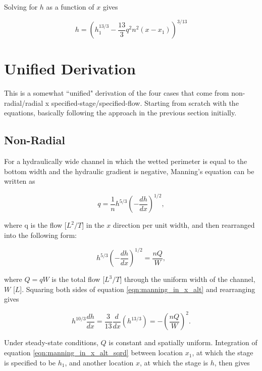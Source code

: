 \documentclass[fleqn]{article}
\begin{document}
\noindent Solving for $h$ as a function of $x$ gives

\begin{equation}
  h = \left ( h_1^{13/3} - \frac{13}{3} q^2 n^2 (x - x_1) \right )^{3/13}
  \label{eqn:manning4}
\end{equation}

\section{Unified Derivation}

This is a somewhat ``unified" derivation of the four cases that come from non-radial/radial x specified-stage/specified-flow. Starting from scratch with the equations, basically following the approach in the previous section initially.

\subsection{Non-Radial}

For a hydraulically wide channel in which the wetted perimeter is equal to the bottom width and the hydraulic gradient is negative, Manning's equation can be written as

\begin{equation}
  q = \frac{1}{n} h^{5/3} \left ( - \frac{dh}{dx} \right )^ {1/2} ,
  \label{eqn:manning_in_x}
\end{equation}

\noindent where q is the flow [$L^2/T$] in the $x$ direction per unit width, and then rearranged into the following form:

\begin{equation}
  h^{5/3} \left ( - \frac{dh}{dx} \right )^ {1/2} = \frac{n Q}{W} ,
  \label{eqn:manning_in_x_alt}
\end{equation}

\noindent where $Q = q W$ is the total flow [$L^3/T$] through the uniform width of the channel, $W$ [$L$]. Squaring both sides of equation \ref{eqn:manning_in_x_alt} and rearranging gives

\begin{equation}
  h^{10/3} \frac{dh}{dx} = \frac{3}{13} \frac{d}{dx} \left ( h^{13/3} \right ) = -\left ( \frac{n Q}{W} \right )^{2}.
  \label{eqn:manning_in_x_alt_sqrd}
\end{equation}

\noindent Under steady-state conditions, $Q$ is constant and spatially uniform. Integration of equation \ref{eqn:manning_in_x_alt_sqrd} between location $x_{1}$, at which the stage is specified to be $h_{1}$, and another location $x$, at which the stage is $h$, then gives
\end{document}
